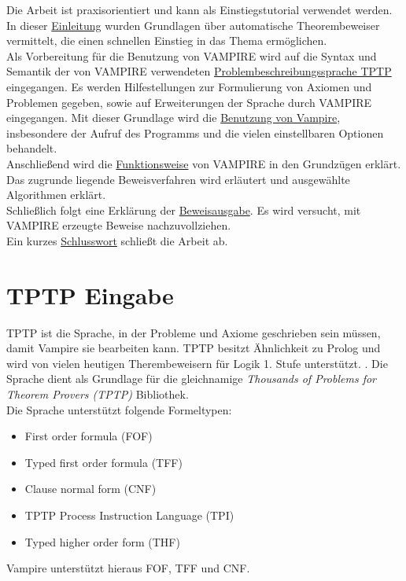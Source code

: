 \documentclass{article}
\begin{document}
Die Arbeit ist praxisorientiert und kann als Einstiegstutorial verwendet werden.
In dieser \hyperref[sec:introduction]{Einleitung} wurden Grundlagen über automatische Theorembeweiser vermittelt, die einen schnellen Einstieg in das Thema ermöglichen.\\
Als Vorbereitung für die Benutzung von VAMPIRE wird auf die Syntax und Semantik der von VAMPIRE verwendeten \hyperref[sec:input]{Problembeschreibungssprache TPTP} eingegangen. Es werden Hilfestellungen zur Formulierung von Axiomen und Problemen gegeben, sowie auf Erweiterungen der Sprache durch VAMPIRE eingegangen.
Mit dieser Grundlage wird die \hyperref[sec:invocation]{Benutzung von Vampire}, insbesondere der Aufruf des Programms und die vielen einstellbaren Optionen behandelt.\\
Anschließend wird die \hyperref[sec:mechanics]{Funktionsweise} von VAMPIRE in den Grundzügen erklärt. Das zugrunde liegende Beweisverfahren wird erläutert und ausgewählte Algorithmen erklärt.\\
Schließlich folgt eine Erklärung der \hyperref[sec:output]{Beweisausgabe}. Es wird versucht, mit VAMPIRE erzeugte Beweise nachzuvollziehen.\\
Ein kurzes \hyperref[sec:conclusion]{Schlusswort} schließt die Arbeit ab.



\section{TPTP Eingabe}
\label{sec:input}

TPTP ist die Sprache, in der Probleme und Axiome geschrieben sein müssen, damit Vampire sie bearbeiten kann. TPTP besitzt Ähnlichkeit zu Prolog und wird von vielen heutigen Therembeweisern für Logik 1. Stufe unterstützt. \cite[S. 4]{cav2013}. Die Sprache dient als Grundlage für die gleichnamige \textit{Thousands of Problems for Theorem Provers (TPTP)} Bibliothek.\\
Die Sprache unterstützt folgende Formeltypen:
\begin{itemize}
	\item First order formula (FOF)
	\item Typed first order formula (TFF)
	\item Clause normal form (CNF)
	\item TPTP Process Instruction Language  (TPI)
	\item Typed higher order form (THF)
\end{itemize}
Vampire unterstützt hieraus FOF, TFF und CNF.
\end{document}

